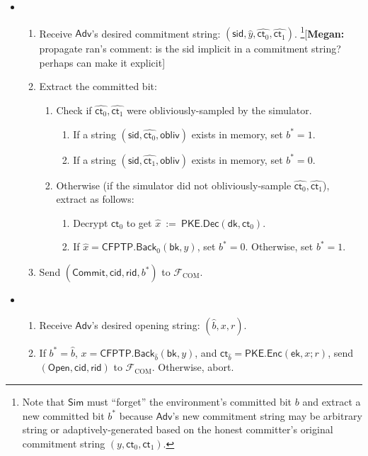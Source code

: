 \documentclass[11pt,letterpaper]{article}
\newcommand{\authnote}[2]{[{\color{red}\textbf{#1:}}~{\color{blue} #2}]}
\newcommand{\authnote}[2]{}
\newcommand{\megan}[1]{\authnote{Megan}{#1}}
\theoremstyle{plain} %
\theoremstyle{definition} %
\theoremstyle{remark} %
\newcommand{\eqdef}{\ {:=} \ }
\newcommand{\OpenMsg}{\mathsf{Open}}
\newcommand{\CommitMsg}{\mathsf{Commit}}
\newcommand{\obliv}{\mathsf{obliv}}
\newcommand{\Input}{x}
\newcommand{\PKE}{\mathsf{PKE}}
\newcommand{\Enc}{\mathsf{Enc}}
\newcommand{\Dec}{\mathsf{Dec}}
\newcommand{\EncKey}{\mathsf{ek}}
\newcommand{\DecKey}{\mathsf{dk}}
\newcommand{\ExtBit}{b^*}
\newcommand{\AdvBit}{\Adv{b}}
\newcommand{\Ct}{\mathsf{ct}}
\newcommand{\Rand}{r}
\newcommand{\CFPTP}{\mathsf{CFPTP}}
\newcommand{\Back}{\mathsf{Back}}
\newcommand{\BackKey}{\mathsf{bk}}
\newcommand{\Output}{y}
\newcommand{\Simulator}{{\mathsf{Sim}}} %
\newcommand{\Adversary}{{\mathsf{Adv}}} %
\newcommand{\Adv}[1]{\hat{#1}} %
\newcommand{\IF}{\mathcal{F}} %
\newcommand{\sid}{\mathsf{sid}}
\newcommand{\CommitterId}{\mathsf{cid}}
\newcommand{\ReceiverId}{\mathsf{rid}}
\newcommand{\IFCom}{\IF_{\mathrm{COM}}}
\newcommand{\CommBit}{b}
\begin{document}
\begin{itemize}
\item {}
\begin{enumerate}[nolistsep]
    \item Receive $\Adversary$'s desired commitment string: $(\sid, \Adv{\Output}, \Adv{\Ct_0}, \Adv{\Ct_1})$. \footnote{Note that $\Simulator$ must ``forget'' the environment's committed bit $\CommBit$ and extract a new committed bit $\ExtBit$ because $\Adversary$'s new commitment string may be arbitrary string or adaptively-generated based on the honest committer's original commitment string $(\Output, \Ct_0, \Ct_1)$.}\megan{propagate ran's comment: is the sid implicit in a commitment string? perhaps can make it explicit}
    \item Extract the committed bit:
    \begin{enumerate}[nolistsep]
        \item Check if $\Adv{\Ct_{0}}, \Adv{\Ct_{1}}$ were obliviously-sampled by the simulator.
        \begin{enumerate}[nolistsep]
            \item If a string $(\sid, \Adv{\Ct_{0}} ,\obliv)$ exists in memory, set $\ExtBit = 1$.
            \item If a string $(\sid, \Adv{\Ct_{1}} ,\obliv)$ exists in memory, set $\ExtBit = 0$.
        \end{enumerate}
        \item Otherwise (if the simulator did not obliviously-sample $\Adv{\Ct_{0}}, \Adv{\Ct_{1}}$), extract as follows:
        \begin{enumerate}[nolistsep]
            \item Decrypt $\Ct_0$ to get $\Adv{\Input} \eqdef \PKE.\Dec(\DecKey, \Ct_0)$.
            \item If $\Adv{\Input} = \CFPTP.\Back_0(\BackKey, \Output)$, set $\ExtBit = 0$. Otherwise, set $\ExtBit = 1$.
        \end{enumerate}
    \end{enumerate}
    \item Send $(\CommitMsg, \CommitterId, \ReceiverId, \ExtBit)$ to $\IFCom$.
\end{enumerate}

\item {}
\begin{enumerate}[nolistsep]
    \item Receive $\Adversary$'s desired opening string: $(\AdvBit, \Input, \Rand)$.
	\item If $\ExtBit = \AdvBit$, $\Input = \CFPTP.\Back_{\AdvBit}(\BackKey, \Output)$, and $\Ct_{\AdvBit} = \PKE.\Enc(\EncKey, \Input; \Rand)$, send $(\OpenMsg, \CommitterId, \ReceiverId)$ to $\IFCom$. Otherwise, abort.
\end{enumerate}

\end{itemize}
\end{document}
